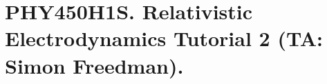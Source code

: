 
%

\chapter{PHY450H1S.  Relativistic Electrodynamics Tutorial 2 (TA: Simon Freedman).}
\label{chap:relativisticElectrodynamicsT2}
{}
\date{Jan XX, 2011}

\beginArtNoToc

\section{}

\EndNoBibArticle
